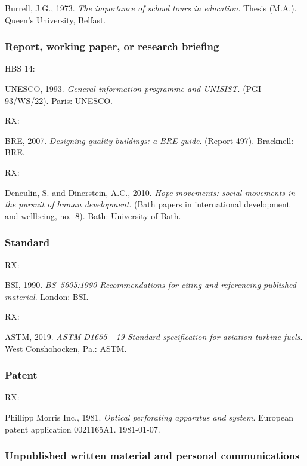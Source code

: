 Burrell, J.G., 1973. \emph{The importance of school tours in education}. Thesis (M.A.). Queen's University, Belfast.



\subsubsection*{Report, working paper, or research briefing}

HBS 14: \cite{unesco1993gip}

UNESCO, 1993. \emph{General information programme and UNISIST}. (PGI-93/WS/22). Paris: UNESCO.


RX: \cite{bre2007dqb}

BRE, 2007. \emph{Designing quality buildings: a BRE guide}. (Report 497). Bracknell: BRE.


RX: \cite{deneulin.dinerstein2010hms}

Deneulin, S. and Dinerstein, A.C., 2010. \emph{Hope movements: social movements in the pursuit of human development}. (Bath papers in international development and wellbeing, no.~8). Bath: University of Bath.



\subsubsection*{Standard}

RX: \cite{bs5605:1990}

BSI, 1990. \emph{BS~5605:1990 Recommendations for citing and referencing published material}. London: BSI.


RX: \cite{astm.d1655}

ASTM, 2019. \emph{ASTM D1655 - 19 Standard specification for aviation turbine fuels}. West Conshohocken, Pa.: ASTM.



\subsubsection*{Patent}

RX: \cite{pm1981opa}

Phillipp Morris Inc., 1981. \emph{Optical perforating apparatus and system}. European patent application 0021165A1. 1981-01-07.



\subsubsection*{Unpublished written material and personal communications}

